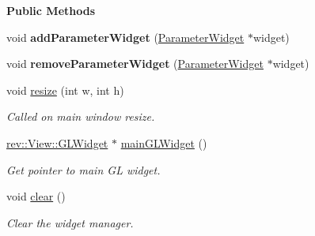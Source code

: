 \begin{Indent}\textbf{ Public Methods}\par
\begin{DoxyCompactItemize}
\item 
\mbox{\label{classrev_1_1_view_1_1_widget_manager_aca1cb48c55803ec68dde75f03890f14e}} 
void {\bfseries add\+Parameter\+Widget} (\mbox{\hyperlink{classrev_1_1_view_1_1_parameter_widget}{Parameter\+Widget}} $\ast$widget)
\item 
\mbox{\label{classrev_1_1_view_1_1_widget_manager_a59fe072f875787b07baa86a9049709d6}} 
void {\bfseries remove\+Parameter\+Widget} (\mbox{\hyperlink{classrev_1_1_view_1_1_parameter_widget}{Parameter\+Widget}} $\ast$widget)
\item 
\mbox{\label{classrev_1_1_view_1_1_widget_manager_ab0c5d21e72a3e3107cbe24f4172ae97f}} 
void \mbox{\hyperlink{classrev_1_1_view_1_1_widget_manager_ab0c5d21e72a3e3107cbe24f4172ae97f}{resize}} (int w, int h)
\begin{DoxyCompactList}\small\item\em Called on main window resize. \end{DoxyCompactList}\item 
\mbox{\label{classrev_1_1_view_1_1_widget_manager_a168028d39fa2d2ac62bfed543020db3b}} 
\mbox{\hyperlink{classrev_1_1_view_1_1_g_l_widget}{rev\+::\+View\+::\+G\+L\+Widget}} $\ast$ \mbox{\hyperlink{classrev_1_1_view_1_1_widget_manager_a168028d39fa2d2ac62bfed543020db3b}{main\+G\+L\+Widget}} ()
\begin{DoxyCompactList}\small\item\em Get pointer to main GL widget. \end{DoxyCompactList}\item 
\mbox{\label{classrev_1_1_view_1_1_widget_manager_ab8f5c14cc106cb2bc1d09a1e2b7b1b12}} 
void \mbox{\hyperlink{classrev_1_1_view_1_1_widget_manager_ab8f5c14cc106cb2bc1d09a1e2b7b1b12}{clear}} ()
\begin{DoxyCompactList}\small\item\em Clear the widget manager. \end{DoxyCompactList}\item 

\end{DoxyCompactItemize}
\end{Indent}
